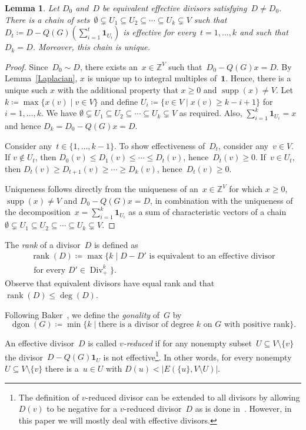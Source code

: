 \documentclass[10pt]{amsart}
\newtheorem{lemma}[theorem]{Lemma}
\newcommand{\Z}{\ensuremath{\mathbb{Z}}}
\newcommand{\one}{\ensuremath{\mathbf{1}}}
\DeclareMathOperator{\Div}{Div}
\DeclareMathOperator{\dgon}{dgon}
\DeclareMathOperator{\supp}{supp}
\DeclareMathOperator{\rank}{rank}
\begin{document}
\begin{lemma}\label{chain}
Let $D_0$ and~$D$ be equivalent effective divisors satisfying~$D \neq D_0$. There is a chain of sets~$\emptyset\subsetneq U_1\subseteq U_2\subseteq \cdots\subseteq U_k\subsetneq V$ such that $D_t\coloneqq D-Q(G)(\sum_{i=1}^t \one_{U_i})$ is effective for every~$t=1,\ldots,k$ and such that~$D_k=D$. Moreover, this chain is unique.
\end{lemma}
\begin{proof}
Since~$D_0\sim D$, there exists an~$x\in \Z^V$ such that~$D_0-Q(G)x=D$. By Lemma~\ref{Laplacian}, $x$ is unique up to integral multiples of~$\one$. Hence, there is a unique such $x$ with the additional property that $x\geq 0$ and $\supp(x)\neq V$. Let $k\coloneqq \max\{x(v)\mid v\in V\}$ and define $U_i\coloneqq \{v\in V\mid x(v)\geq k-i+1\}$ for $i=1,\ldots, k$. We have $\emptyset\subsetneq U_1\subseteq U_2\subseteq \cdots\subseteq U_k\subsetneq V$ as required. Also, $\sum_{i=1}^k \one_{U_i}=x$ and hence $D_k=D_0-Q(G)x=D$.

Consider any~$t\in \{1,\ldots, k-1\}$. To show effectiveness of~$D_t$, consider any~$v\in V$. If $v\not\in U_t$, then $D_0(v)\leq D_1(v)\leq \cdots\leq D_t(v)$, hence~$D_t(v)\geq 0$. If~$v\in U_t$, then $D_t(v)\geq D_{t+1}(v)\geq \cdots \geq D_k(v)$, hence~$D_t(v)\geq 0$. 

Uniqueness follows directly from the uniqueness of an~$x\in \Z^V$ for which $x\geq 0$, $\supp(x)\neq V$ and $D_0-Q(G)x=D$, in combination with the uniqueness of the decomposition~$x=\sum_{i=1}^k\one_{U_i}$ as a sum of characteristic vectors of a chain~$\emptyset\subsetneq U_1\subseteq U_2\subseteq \cdots\subseteq U_k\subsetneq V$.
\end{proof}

The \emph{rank} of a divisor~$D$ is defined as
\begin{multline}
\rank(D)\coloneqq \max\{k\mid \text{$D-D'$ is equivalent to an effective divisor}\\\text{ for every~$D'\in\Div_+^k$}\}.
\end{multline}
Observe that equivalent divisors have equal rank and that $\rank(D)\leq \deg(D)$.

Following Baker~\cite{Baker2008}, we define the \emph{gonality} of~$G$ by
\begin{equation}
\dgon(G)\coloneqq \min\{k\mid \text{there is a divisor of degree~$k$ on~$G$ with positive rank}\}.
\end{equation} 


An effective divisor~$D$ is called \emph{$v$-reduced} if for any nonempty subset~$U\subseteq V\setminus \{v\}$ the divisor~$D-Q(G)\one_U$ is not effective\footnote{The definition of $v$-reduced divisor can be extended to all divisors by allowing $D(v)$ to be negative for a $v$-reduced divisor~$D$ as is done in~\cite{BakerNorine2007}. However, in this paper we will mostly deal with effective divisors.}. In other words, for every nonempty~$U\subseteq V\setminus \{v\}$ there is a~$u\in U$ with $D(u)<|E(\{u\}, V\setminus U)|$. 
\end{document}
